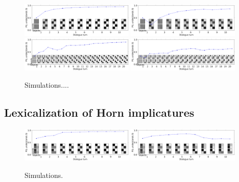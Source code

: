 \documentclass{article} %
\begin{document}
\begin{figure}[t]
\centering
\includegraphics[width=0.48\textwidth]{figures/emergence2x2-1.pdf}
\includegraphics[width=0.48\textwidth]{figures/emergence2x2-3.pdf} \\
\includegraphics[width=0.48\textwidth]{figures/emergence3x3-0.pdf}
\includegraphics[width=0.48\textwidth]{figures/emergence3x3-1.pdf} \\
\caption{\label{fig:emergence} Simulations....}
\end{figure}

\subsection{Lexicalization of Horn implicatures}

\begin{figure}[t]
\centering
\includegraphics[width=0.48\textwidth]{figures/horn-emergence-0.pdf}
\includegraphics[width=0.48\textwidth]{figures/horn-emergence-1.pdf}
\caption{\label{fig:horn} Simulations.}
\end{figure}
\end{document}
